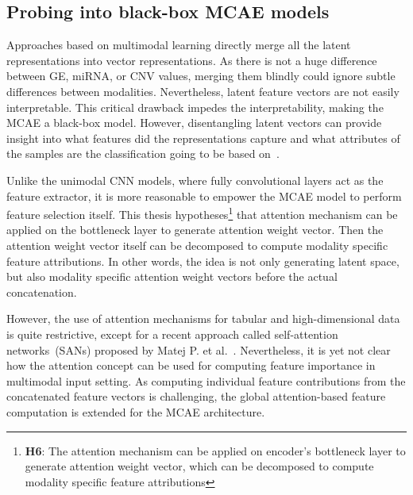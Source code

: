 \subsection{Probing into black-box MCAE models}
Approaches based on multimodal learning directly merge all the latent representations into vector representations. As there is not a huge difference between GE, miRNA, or CNV values, merging them blindly could ignore subtle differences between modalities. 
Nevertheless, latent feature vectors are not easily interpretable. This critical drawback impedes the interpretability, making the MCAE a black-box model. However, disentangling latent vectors can provide insight into what features did the representations capture and what attributes of the samples are the classification going to be based on~\cite{karimTCBB2020}. 

\hspace*{3.5mm} Unlike the unimodal CNN models, where fully convolutional layers act as the feature extractor, it is more reasonable to empower the MCAE model to perform feature selection itself. This thesis hypotheses\footnote{\textbf{H6}: The attention mechanism can be applied on encoder's bottleneck layer to generate attention weight vector, which can be decomposed to compute modality specific feature attributions} that attention mechanism can be applied on the bottleneck layer to generate attention weight vector. Then the attention weight vector itself can be decomposed to compute modality specific feature attributions. In other words, the idea is not only generating latent space, but also modality specific attention weight vectors before the actual concatenation. %

\hspace*{3.5mm} However, the use of attention mechanisms for tabular and high-dimensional data is quite restrictive, except for a recent approach called self-attention networks~(SANs) proposed by Matej P. et al.~\cite{vskrlj2020feature}. Nevertheless, it is yet not clear how the attention concept can be used for computing feature importance in multimodal input setting.
As computing individual feature contributions from the concatenated feature vectors is challenging, the global attention-based feature computation is extended for the MCAE architecture. 

